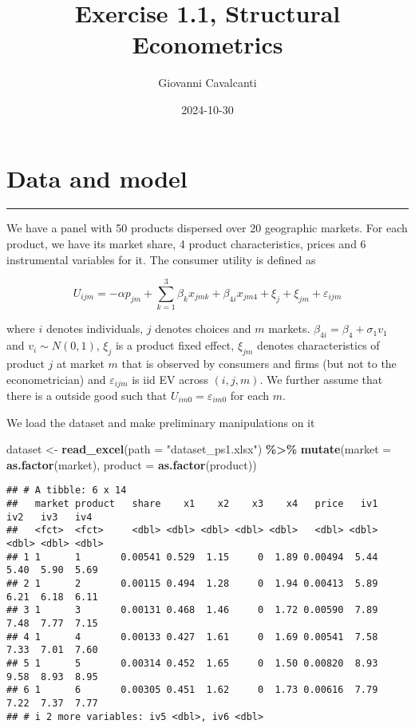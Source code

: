 \documentclass[
]{article}
\title{Exercise 1.1, Structural Econometrics}
\author{Giovanni Cavalcanti}
\date{2024-10-30}
\newenvironment{Shaded}{\begin{snugshade}}{\end{snugshade}}
\newcommand{\AttributeTok}[1]{\textcolor[rgb]{0.13,0.29,0.53}{#1}}
\newcommand{\FunctionTok}[1]{\textcolor[rgb]{0.13,0.29,0.53}{\textbf{#1}}}
\newcommand{\NormalTok}[1]{#1}
\newcommand{\OtherTok}[1]{\textcolor[rgb]{0.56,0.35,0.01}{#1}}
\newcommand{\SpecialCharTok}[1]{\textcolor[rgb]{0.81,0.36,0.00}{\textbf{#1}}}
\newcommand{\StringTok}[1]{\textcolor[rgb]{0.31,0.60,0.02}{#1}}
\begin{document}
\maketitle

\section{Data and model}\label{data-and-model}

\begin{center}\rule{0.5\linewidth}{0.5pt}\end{center}

We have a panel with 50 products dispersed over 20 geographic markets.
For each product, we have its market share, 4 product characteristics,
prices and 6 instrumental variables for it. The consumer utility is
defined as

\[
U_{ijm}= -\alpha p_{jm} + \sum_{k=1}^{3}\beta_k x_{jmk} + \beta_{4i} x_{jm4} + \xi_j + \xi_{jm} + \varepsilon_{ijm}
\]

where \(i\) denotes individuals, \(j\) denotes choices and \(m\)
markets. \(\beta_{4i}= \beta_4 + \sigma_1v_1\) and \(v_i \sim N(0, 1)\),
\(\xi_j\) is a product fixed effect, \(\xi_{jm}\) denotes
characteristics of product \(j\) at market \(m\) that is observed by
consumers and firms (but not to the econometrician) and
\(\varepsilon_{ijm}\) is iid EV across \((i,j,m)\). We further assume
that there is a outside good such that \(U_{im0}=\varepsilon_{im0}\) for
each \(m\).

We load the dataset and make preliminary manipulations on it

\begin{Shaded}
\begin{Highlighting}[]
\NormalTok{dataset }\OtherTok{\textless{}{-}} \FunctionTok{read\_excel}\NormalTok{(}\AttributeTok{path =} \StringTok{"dataset\_ps1.xlsx"}\NormalTok{) }\SpecialCharTok{\%\textgreater{}\%}
  \FunctionTok{mutate}\NormalTok{(}\AttributeTok{market =} \FunctionTok{as.factor}\NormalTok{(market),}
         \AttributeTok{product =} \FunctionTok{as.factor}\NormalTok{(product))}
\end{Highlighting}
\end{Shaded}

\begin{verbatim}
## # A tibble: 6 x 14
##   market product   share    x1    x2    x3    x4   price   iv1   iv2   iv3   iv4
##   <fct>  <fct>     <dbl> <dbl> <dbl> <dbl> <dbl>   <dbl> <dbl> <dbl> <dbl> <dbl>
## 1 1      1       0.00541 0.529  1.15     0  1.89 0.00494  5.44  5.40  5.90  5.69
## 2 1      2       0.00115 0.494  1.28     0  1.94 0.00413  5.89  6.21  6.18  6.11
## 3 1      3       0.00131 0.468  1.46     0  1.72 0.00590  7.89  7.48  7.77  7.15
## 4 1      4       0.00133 0.427  1.61     0  1.69 0.00541  7.58  7.33  7.01  7.60
## 5 1      5       0.00314 0.452  1.65     0  1.50 0.00820  8.93  9.58  8.93  8.95
## 6 1      6       0.00305 0.451  1.62     0  1.73 0.00616  7.79  7.22  7.37  7.77
## # i 2 more variables: iv5 <dbl>, iv6 <dbl>
\end{verbatim}
\end{document}
